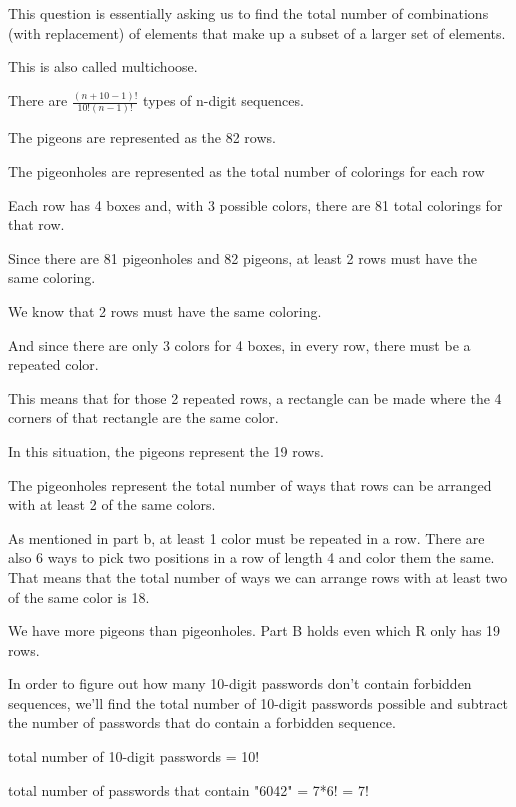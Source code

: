 \documentclass{6042}
\begin{document}

This question is essentially asking us to find the total number of combinations (with replacement) of elements that make up a subset of a larger set of elements.

This is also called multichoose.

There are $\frac{(n + 10-1)!}{10!(n-1)!}$ types of n-digit sequences.



The pigeons are represented as the 82 rows. 

The pigeonholes are represented as the total number of colorings for each row

Each row has 4 boxes and, with 3 possible colors, there are 81 total colorings for that row.

Since there are 81 pigeonholes and 82 pigeons, at least 2 rows must have the same coloring.


We know that 2 rows must have the same coloring.

And since there are only 3 colors for 4 boxes, in every row, there must be a repeated color.

This means that for those 2 repeated rows, a rectangle can be made where the 4 corners of that rectangle are the same color.

In this situation, the pigeons represent the 19 rows.

The pigeonholes represent the total number of ways that rows can be arranged with at least 2 of the same colors. 

As mentioned in part b, at least 1 color must be repeated in a row. There are also 6 ways to pick two positions in a row of length 4 and color them the same.
That means that the total number of ways we can arrange rows with at least two of the same color is 18.

We have more pigeons than pigeonholes. Part B holds even which R only has 19 rows.


In order to figure out how many 10-digit passwords don't contain forbidden sequences, we'll find the total number of 
10-digit passwords possible and subtract the number of passwords that do contain a forbidden sequence.

total number of 10-digit passwords = 10!

total number of passwords that contain "6042" = 7*6! = 7!
\end{document}
